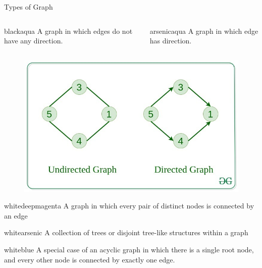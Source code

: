 \documentclass[13pt]{beamer}
\begin{document}
	\begin{frame}[t,allowframebreaks]{Types of Graph}
		\begin{columns}
			\begin{bee}[Undirected Graph,width = 6cm]{black}{aqua}
				A graph in which edges do not have any direction.
			\end{bee}
			\begin{Rbee}[Directed Graph,width = 6cm]{arsenic}{aqua}
				A graph in which edge has direction.
			\end{Rbee}
		\end{columns}
		\begin{figure}
			\centering
			\href{https://media.geeksforgeeks.org/wp-content/uploads/20200630114438/directed.jpg}{
				\includegraphics[height =0.37\paperheight]{Images/directed.png}
			}
		\end{figure}


		\begin{bee}[Complete Graph,width = 8cm]{white}{deepmagenta}
			A graph in which every pair of distinct nodes is connected by an edge
		\end{bee}

		\begin{Rbee}[Forest,width = 0.9\paperwidth]{white}{arsenic}
			A collection of trees or disjoint tree-like structures within a graph
		\end{Rbee}
		\begin{bee}[Tree,width = 0.9\paperwidth]{white}{blue}
			A special case of an acyclic graph in which there is a single root node, and every other node is connected by exactly one edge.
		\end{bee}






	\end{frame}
\end{document}
